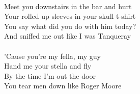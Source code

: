 \\
Meet you downstairs in the bar and hurt \\
Your rolled up sleeves in your skull t-shirt \\
You say what did you do with him today? \\
And sniffed me out like I was Tanqueray \\
\\
'Cause you're my fella, my guy \\
Hand me your stella and fly \\
By the time I'm out the door \\
You tear men down like Roger Moore \\
